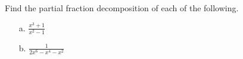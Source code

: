{Find the partial fraction decomposition of each of the following.
\begin{enumerate}
\item[a.] $\displaystyle\frac{x^3+1}{x^2-1}$
\item[b.] $\displaystyle\frac{1}{2x^6-x^4-x^2}$
\end{enumerate}}
{}